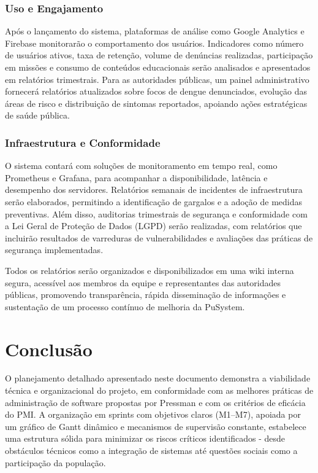 \documentclass[a4paper, 12pt]{article}
\begin{document}
\subsubsection{Uso e Engajamento}

Após o lançamento do sistema, plataformas de análise como Google Analytics e Firebase monitorarão o comportamento dos usuários. Indicadores como número de usuários ativos, taxa de retenção, volume de denúncias realizadas, participação em missões e consumo de conteúdos educacionais serão analisados e apresentados em relatórios trimestrais. Para as autoridades públicas, um painel administrativo fornecerá relatórios atualizados sobre focos de dengue denunciados, evolução das áreas de risco e distribuição de sintomas reportados, apoiando ações estratégicas de saúde pública.

\subsubsection{Infraestrutura e Conformidade}

O sistema contará com soluções de monitoramento em tempo real, como Prometheus e Grafana, para acompanhar a disponibilidade, latência e desempenho dos servidores. Relatórios semanais de incidentes de infraestrutura serão elaborados, permitindo a identificação de gargalos e a adoção de medidas preventivas. Além disso, auditorias trimestrais de segurança e conformidade com a Lei Geral de Proteção de Dados (LGPD) serão realizadas, com relatórios que incluirão resultados de varreduras de vulnerabilidades e avaliações das práticas de segurança implementadas.

Todos os relatórios serão organizados e disponibilizados em uma wiki interna segura, acessível aos membros da equipe e representantes das autoridades públicas, promovendo transparência, rápida disseminação de informações e sustentação de um processo contínuo de melhoria da PuSystem.

\newpage
\section{Conclusão}
O planejamento detalhado apresentado neste documento demonstra a viabilidade técnica e organizacional do projeto, em conformidade com as melhores práticas de administração de software propostas por Pressman e com os critérios de eficácia do PMI. A organização em sprints com objetivos claros (M1–M7), apoiada por um gráfico de Gantt dinâmico e mecanismos de supervisão constante, estabelece uma estrutura sólida para minimizar os riscos críticos identificados - desde obstáculos técnicos como a integração de sistemas até questões sociais como a participação da população.
\end{document}
